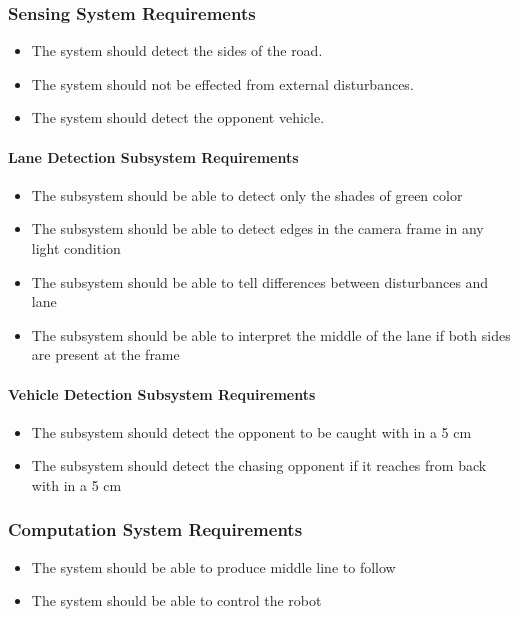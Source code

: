 \documentclass[a4paper,12pt]{article}
\begin{document}
	
	\subsubsection{Sensing System Requirements}
	
		\begin{itemize}
			\item The system should detect the sides of the road.
			\item The system should not be effected from external disturbances.
			\item The system should detect the opponent vehicle.
		\end{itemize}

	\paragraph{Lane Detection Subsystem Requirements}	
		
		\begin{itemize}
			\item The subsystem should be able to detect only the shades of green color
			\item The subsystem should be able to detect edges in the camera frame in any light condition
			\item The subsystem should be able to tell differences between disturbances and lane
			\item The subsystem should be able to interpret the middle of the lane if both sides are present at the frame
		\end{itemize}
	 
	 
	\paragraph{Vehicle Detection Subsystem Requirements}
	
		\begin{itemize}
			\item The subsystem should detect the opponent to be caught with in a 5 cm 
			\item The subsystem should detect the chasing opponent if it reaches from back with in a 5 cm  
		\end{itemize}
		
		
	\subsubsection{Computation System Requirements}
		
		\begin{itemize}
			\item The system should	be able to produce middle line to follow
			\item The system should be able to control the robot
		\end{itemize}			
	
\end{document}
